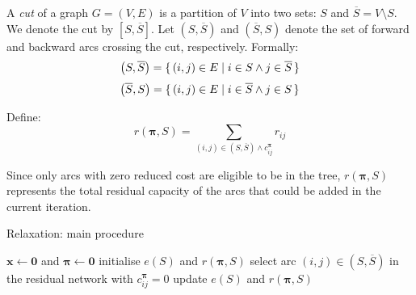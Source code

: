 \begin{defn}[Cuts] \label{defn:relax-cuts}
A \emph{cut} of a graph $G = (V,E)$ is a partition of $V$ into two sets: $S$ and $\overline{S} = V \setminus S$. We denote the cut by $\left[S,\overline{S}\right]$. Let $\left(S,\overline{S}\right)$ and $\left(\overline{S},S\right)$ denote the set of forward and backward arcs crossing the cut, respectively. Formally:
\[\left(S,\overline{S}\right) = \set{(i,j) \in E | i \in S \land j \in \overline{S}}\]
\[\left(\overline{S},S\right) = \set{(i,j) \in E | i \in \overline{S} \land j \in S}\]
\end{defn}

\begin{defn} \label{defn:relax-tree-residual}
Define:
\begin{equation} \label{eq:relax-tree-residual}
r(\boldsymbol{\pi},S) = \sum_{(i,j) \in \left(S,\overline{S}\right) \land c_{ij}^{\boldsymbol{\pi}}} r_{ij}
\end{equation}
\end{defn}

\begin{remark}
Since only arcs with zero reduced cost are eligible to be in the tree, $r(\boldsymbol{\pi},S)$ represents the total residual capacity of the arcs that could be added in the current iteration.
\end{remark}

\begin{algorithm}
    \caption{Relaxation: main procedure}
    \label{algo:relaxation}
    \begin{algorithmic}[1]
        \State $\mathbf{x} \gets \mathbf{0}$ and $\boldsymbol{\pi} \gets \mathbf{0}$ \label{algo:relaxation:initialisation}
         \label{algo:relaxation:outer-loop-start}
        \State initialise $e(S)$ and $r(\boldsymbol{\pi},S)$
         \label{algo:relaxation:first-update-potentials}
        \EndIf
        \label{algo:relaxation:inner-loop-start}
        \State select arc $(i,j) \in \left(S,\overline{S}\right)$ in the residual network with $c_{ij}^{\boldsymbol{\pi}}=0$ \label{algo:relaxation:select-arc}
         \label{algo:relaxation:if-source}
         \label{algo:relaxation:update-predecessor}
         \label{algo:relaxation:add-vertex}
        \State update $e(S)$ and $r(\boldsymbol{\pi},S)$ 
        \label{algo:relaxation:end-if-source}
        \Else
        \State {} \label{algo:relaxation:augment}
        \Break
        \EndIf
        \EndWhile \label{algo:relaxation:inner-loop-end}
         \label{algo:relaxation:second-update-potentials}
        \EndIf
        \EndWhile \label{algo:relaxation:outer-loop-end}
    \end{algorithmic}
\end{algorithm}

